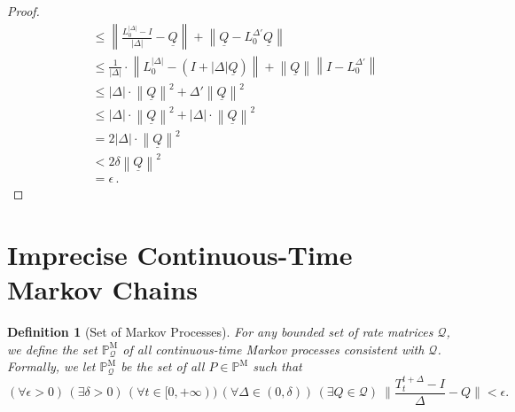 \documentclass[10pt]{paper}
\newtheorem{definition}{Definition}
\newcommand{\processes}{\mathbb{P}}
\newcommand{\mprocesses}{\processes^{\mathrm{M}}}
\newcommand{\rateset}{\mathcal{Q}}
\newcommand{\lrate}{\underline{Q}}
\newcommand{\norm}[1]{\left\lVert #1 \right\rVert}
\begin{document}
\begin{proof}
\begin{align*}
 &\leq \norm{\frac{L_{0}^{\lvert\Delta\rvert} - I}{\lvert\Delta\rvert} - \lrate} + \norm{\lrate - L_{0}^{\Delta'}\lrate} \\
 &\leq \frac{1}{\lvert\Delta\rvert}\cdot\norm{L_{0}^{\lvert\Delta\rvert} - (I+\lvert\Delta\rvert\lrate)} + \norm{\lrate}\norm{I - L_{0}^{\Delta'}} \\
 &\leq \lvert\Delta\rvert\cdot\norm{\lrate}^2 + \Delta'\norm{\lrate}^2 \\
 &\leq \lvert\Delta\rvert\cdot\norm{\lrate}^2 + \lvert\Delta\rvert\cdot\norm{\lrate}^2 \\
 &= 2\lvert\Delta\rvert\cdot\norm{\lrate}^2 \\
 &< 2\delta\norm{\lrate}^2 \\
 &= \epsilon\,.
\end{align*}
\end{proof}

\section{Imprecise Continuous-Time Markov Chains}\label{sec:imp_markov}

\begin{definition}[Set of Markov Processes]\label{def:markov_process_set}
For any bounded set of rate matrices $\rateset$, we define the set $\mprocesses_{\rateset}$ of all continuous-time Markov processes \emph{consistent} with $\rateset$. Formally, we let $\mprocesses_{\rateset}$ be the set of all $P\in\mprocesses$ such that
\begin{equation}\label{eq:conditionforMarkov}
(\forall\epsilon>0)\,
(\exists\delta>0)\,
(\forall t\in[0,+\infty))\,
(\forall\Delta\in(0,\delta))\,
(\exists Q\in\rateset)~
\Big\lVert\frac{T_t^{t+\Delta}-I}{\Delta}-Q\Big\rVert<\epsilon.
\end{equation}
\end{definition}
\end{document}
